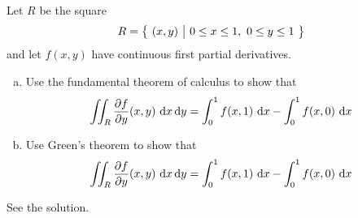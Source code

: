 

\subsection*{\Conceptual}

\begin{question}
Let $R$ be the square
\begin{align*}
R=\big\{ \ (x,y)\ \big|\ 0\le x\le 1,\ 0\le y\le 1\ \big\}
\end{align*}
and let $f(x,y)$ have continuous first partial derivatives.
\begin{enumerate}[(a)]
\item
Use the fundamental theorem of calculus to show that
\begin{align*}
\iint_R\frac{\partial f}{\partial y}(x,y)\ \mathrm{d}x\,\mathrm{d}y
=\int_0^1 f(x,1)\ \mathrm{d}x
  - \int_0^1 f(x,0)\ \mathrm{d}x
\end{align*}
\item
Use Green's theorem to show that
\begin{align*}
\iint_R\frac{\partial f}{\partial y}(x,y)\ \mathrm{d}x\,\mathrm{d}y
=\int_0^1 f(x,1)\ \mathrm{d}x
  - \int_0^1 f(x,0)\ \mathrm{d}x
\end{align*}
\end{enumerate}
\end{question}

%

\begin{answer} 
See the solution.
\end{answer}

